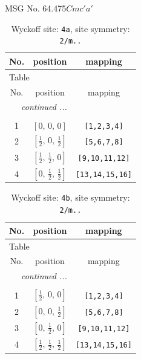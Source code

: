 \documentclass[fleqn,8pt]{jsarticle}
\begin{document}
\setcounter{MaxMatrixCols}{32}

\renewcommand{\tablename}{Table~}
\renewcommand{\figurename}{Figure~}
\begin{center}
\LARGE
MSG No. 64.475\quad$Cmc'a'$
\end{center}
\renewcommand{\arraystretch}{1.2}
\begin{longtable}{ccc}
\caption{Wyckoff site: {\tt 4a}, site symmetry: {\tt 2/m..}}
 \\
 \hline \hline
No. & position & mapping \\ \hline \endfirsthead

\multicolumn{2}{l}{\tablename\ \thetable{}} \\
 \hline \hline
No. & position & mapping \\ \hline \endhead

 \hline \hline
\multicolumn{2}{r}{\footnotesize\it continued ...} \\ \endfoot

 \hline \hline
\multicolumn{2}{r}{} \\ \endlastfoot

1 & $\left[ 0,\, 0,\, 0 \right]$ & {\tt [1,2,3,4]} \\ \hline
2 & $\left[ \frac{1}{2},\, 0,\, \frac{1}{2} \right]$ & {\tt [5,6,7,8]} \\ \hline
3 & $\left[ \frac{1}{2},\, \frac{1}{2},\, 0 \right]$ & {\tt [9,10,11,12]} \\ \hline
4 & $\left[ 0,\, \frac{1}{2},\, \frac{1}{2} \right]$ & {\tt [13,14,15,16]} \\
\end{longtable}
\renewcommand{\arraystretch}{1.2}
\begin{longtable}{ccc}
\caption{Wyckoff site: {\tt 4b}, site symmetry: {\tt 2/m..}}
 \\
 \hline \hline
No. & position & mapping \\ \hline \endfirsthead

\multicolumn{2}{l}{\tablename\ \thetable{}} \\
 \hline \hline
No. & position & mapping \\ \hline \endhead

 \hline \hline
\multicolumn{2}{r}{\footnotesize\it continued ...} \\ \endfoot

 \hline \hline
\multicolumn{2}{r}{} \\ \endlastfoot

1 & $\left[ \frac{1}{2},\, 0,\, 0 \right]$ & {\tt [1,2,3,4]} \\ \hline
2 & $\left[ 0,\, 0,\, \frac{1}{2} \right]$ & {\tt [5,6,7,8]} \\ \hline
3 & $\left[ 0,\, \frac{1}{2},\, 0 \right]$ & {\tt [9,10,11,12]} \\ \hline
4 & $\left[ \frac{1}{2},\, \frac{1}{2},\, \frac{1}{2} \right]$ & {\tt [13,14,15,16]} \\
\end{longtable}
\end{document}
